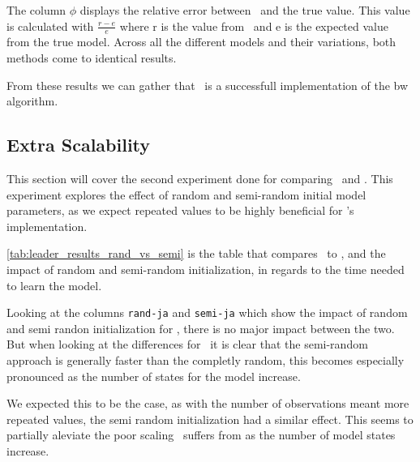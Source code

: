 The column $\phi$ displays the relative error between \Cupaal\ and the true value.
This value is calculated with $\frac{r-e}{e}$ where r is the value from \Cupaal\ and e is the expected value from the true model.
Across all the different models and their variations, both methods come to identical results.




From these results we can gather that \Cupaal\ is a successfull implementation of the \gls{bw} algorithm.



\subsection{Extra Scalability}\label{subsec:extra_scalability}
This section will cover the second experiment done for comparing \Cupaal\ and \Jajapy.
This experiment explores the effect of random and semi-random initial model parameters, as we expect repeated values to be highly beneficial for \Cupaal's implementation.

\autoref{tab:leader_results_rand_vs_semi} is the table that compares \Cupaal\ to \Jajapy, and the impact of random and semi-random initialization, in regards to the time needed to learn the model.

Looking at the columns \texttt{rand-ja} and \texttt{semi-ja} which show the impact of random and semi randon initialization for \Jajapy, there is no major impact between the two.
But when looking at the differences for \Cupaal\ it is clear that the semi-random approach is generally faster than the completly random, this becomes especially pronounced as the number of states for the model increase.

We expected this to be the case, as with the number of observations meant more repeated values, the semi random initialization had a similar effect.
This seems to partially aleviate the poor scaling \Cupaal\ suffers from as the number of model states increase.

